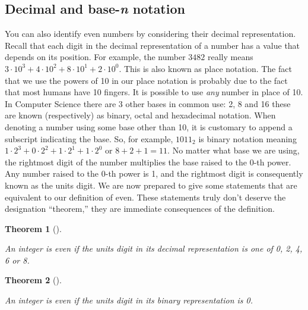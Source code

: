 \documentclass[10pt,]{book}
\theoremstyle{plain}
\newtheorem{theorem}{Theorem}[section]
\theoremstyle{definition}
\theoremstyle{definition}
\numberwithin{equation}{section}
\begin{document}
\subsection[{Decimal and base-\emph{n} notation}]{Decimal and base-\emph{n} notation}\label{base-n}

      You can also identify even numbers by considering their
      decimal representation. Recall that each digit in the
      decimal representation of a number has a value that depends
      on its position. For example, the number \(3482\) really means
      \(3\cdot10^3 + 4\cdot10^2 + 8\cdot10^1 + 2\cdot10^0\). This
      is also known as place notation.
      The fact that we use the
      powers of 10 in our place notation is probably due to the
      fact that most humans have 10 fingers. It is possible to
      use \emph{any} number in place of 10. In Computer Science there
      are 3 other bases in common use: 2, 8 and 16 \textemdash{} these are
      known (respectively) as binary, octal and hexadecimal notation.
      When denoting a number using some base other than 10, it is
      customary to append a subscript indicating the base.
      So, for example, \(1011_2\) is binary notation meaning
      \(1\cdot2^3 + 0\cdot2^2 + 1\cdot2^1 + 1\cdot2^0\) or \(8+2+1 = 11\).
      No matter what base we are using, the rightmost digit of
      the number multiplies the base raised to the \(0\)-th power.
      Any number raised to the \(0\)-th power is 1, and the rightmost
      digit is consequently known as the units digit. We are now
      prepared to give some statements that are equivalent to our
      definition of even. These statements truly don't deserve the
      designation ``theorem,'' they are immediate consequences of the
      definition.
\begin{theorem}[{}]\label{theorem-1}

          An integer is \emph{even} if the units digit in its decimal
          representation is one of 0, 2, 4, 6 or 8.
\end{theorem}
\begin{theorem}[{}]\label{theorem-2}

          An integer is \emph{even} if the units digit in its binary
          representation is 0.
\end{theorem}
\par
\end{document}

